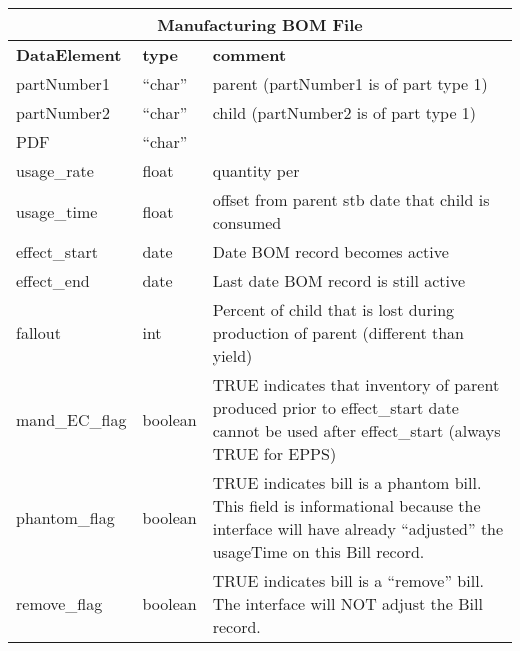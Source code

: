 \begin{tabular}{llp{4in}}
\multicolumn{3}{c}{{\bf Manufacturing BOM File}}\\ \hline\hline
{\bf DataElement} &  {\bf type}  &   {\bf comment} \\ \hline
partNumber1 &  ``char'' &    parent (partNumber1 is of part type 1) \\
partNumber2 &  ``char'' &    child  (partNumber2 is of part type 1) \\
PDF     &   ``char'' \\
usage\_rate     &   float  &    quantity per \\
usage\_time    &    float  &    offset from parent stb date that child
                             is consumed \\
effect\_start   &   date  &     Date BOM record becomes active  \\
effect\_end     &   date  &     Last date BOM record is still active \\
fallout        &   int   &     Percent of child that is lost during
                             production of parent (different than
                             yield) \\
mand\_EC\_flag   &   boolean &   TRUE indicates that inventory of
                             parent produced prior to effect\_start
                             date cannot be used after effect\_start
                             (always TRUE for EPPS) \\
phantom\_flag   &   boolean &   TRUE indicates bill is a phantom  bill.
                             This field is informational because the
                             interface will have already ``adjusted''
                             the usageTime on this Bill record. \\
remove\_flag    &   boolean  &  TRUE indicates bill is a ``remove'' bill.
                             The interface will NOT adjust the Bill
                             record. \\
\end{tabular}


